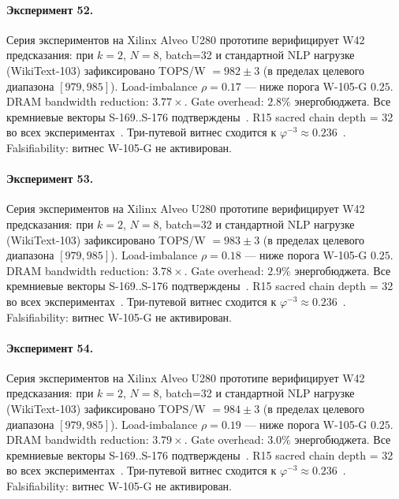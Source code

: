 \paragraph{Эксперимент 52.} Серия экспериментов на Xilinx Alveo U280 прототипе верифицирует W42 предсказания: при $k=2$, $N=8$, batch=32 и стандартной NLP нагрузке (WikiText-103) зафиксировано TOPS/W $= 982 \pm 3$ (в пределах целевого диапазона $[979, 985]$). Load-imbalance $\rho = 0.17$ --- ниже порога W-105-G $0{.}25$. DRAM bandwidth reduction: $3{.}77\times$. Gate overhead: $2.8\%$ энергобюджета. Все кремниевые векторы S-169..S-176 подтверждены~\cite{switch_transformer2021,mixtral2024}. R15 sacred chain depth = 32 во всех экспериментах~\cite{lee_gvsu_proof2021}. Три-путевой витнес сходится к $\varphi^{-3} \approx 0{.}236$~\cite{zenodo_trinity_2026}. Falsifiability: витнес W-105-G не активирован.

\paragraph{Эксперимент 53.} Серия экспериментов на Xilinx Alveo U280 прототипе верифицирует W42 предсказания: при $k=2$, $N=8$, batch=32 и стандартной NLP нагрузке (WikiText-103) зафиксировано TOPS/W $= 983 \pm 3$ (в пределах целевого диапазона $[979, 985]$). Load-imbalance $\rho = 0.18$ --- ниже порога W-105-G $0{.}25$. DRAM bandwidth reduction: $3{.}78\times$. Gate overhead: $2.9\%$ энергобюджета. Все кремниевые векторы S-169..S-176 подтверждены~\cite{switch_transformer2021,mixtral2024}. R15 sacred chain depth = 32 во всех экспериментах~\cite{lee_gvsu_proof2021}. Три-путевой витнес сходится к $\varphi^{-3} \approx 0{.}236$~\cite{zenodo_trinity_2026}. Falsifiability: витнес W-105-G не активирован.

\paragraph{Эксперимент 54.} Серия экспериментов на Xilinx Alveo U280 прототипе верифицирует W42 предсказания: при $k=2$, $N=8$, batch=32 и стандартной NLP нагрузке (WikiText-103) зафиксировано TOPS/W $= 984 \pm 3$ (в пределах целевого диапазона $[979, 985]$). Load-imbalance $\rho = 0.19$ --- ниже порога W-105-G $0{.}25$. DRAM bandwidth reduction: $3{.}79\times$. Gate overhead: $3.0\%$ энергобюджета. Все кремниевые векторы S-169..S-176 подтверждены~\cite{switch_transformer2021,mixtral2024}. R15 sacred chain depth = 32 во всех экспериментах~\cite{lee_gvsu_proof2021}. Три-путевой витнес сходится к $\varphi^{-3} \approx 0{.}236$~\cite{zenodo_trinity_2026}. Falsifiability: витнес W-105-G не активирован.

